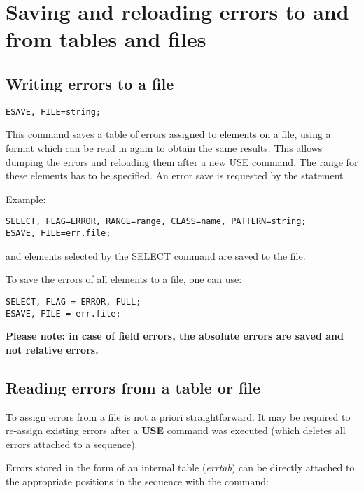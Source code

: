 
\section{Saving and reloading errors to and from tables and files} 
\label{sec:error_save}

\subsection{Writing errors to a file}

\begin{verbatim}
ESAVE, FILE=string;
\end{verbatim}

This command saves a table of errors assigned to elements on a file,
using a format which can be read in again to obtain the same
results. This allows dumping the errors and reloading them after a new
USE command. The range for these elements has to be specified. An error
save is requested by the statement  

Example: 
\begin{verbatim}
SELECT, FLAG=ERROR, RANGE=range, CLASS=name, PATTERN=string;
ESAVE, FILE=err.file;
\end{verbatim} 
and elements selected by the  \href{../Introduction/select.html}{SELECT}
command are saved to the file.  


To save the errors of all elements to a file, one can use: 
\begin{verbatim}
SELECT, FLAG = ERROR, FULL;                                    
ESAVE, FILE = err.file;
\end{verbatim}

{\bf Please note: in case of field errors, the absolute errors are
  saved and not relative errors. } 

\subsection{Reading errors from a table or file}

To assign errors from a file is not a priori straightforward. It may be
required to re-assign existing errors after a \textbf{USE} command was
executed (which deletes all errors attached to a sequence).  

Errors stored in the form of an internal table (\textit{errtab}) can  be
directly attached to the appropriate positions in the sequence with the
command:  

